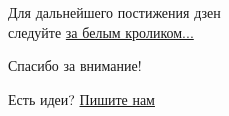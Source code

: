\vspace*{\fill}
\begin{center}
    Для дальнейшего постижения дзен\\следуйте \href{https://antoniii.github.io/dzen}{за белым кроликом...}
\end{center}
\vspace{2em}
\begin{center}
    \large 
    Спасибо за внимание!

    \vspace{2em}
    Есть идеи?
    \href{mailto:anto-kha0@rambler.ru}{Пишите нам}
\end{center}
\vfill
\pagestyle{empty}


